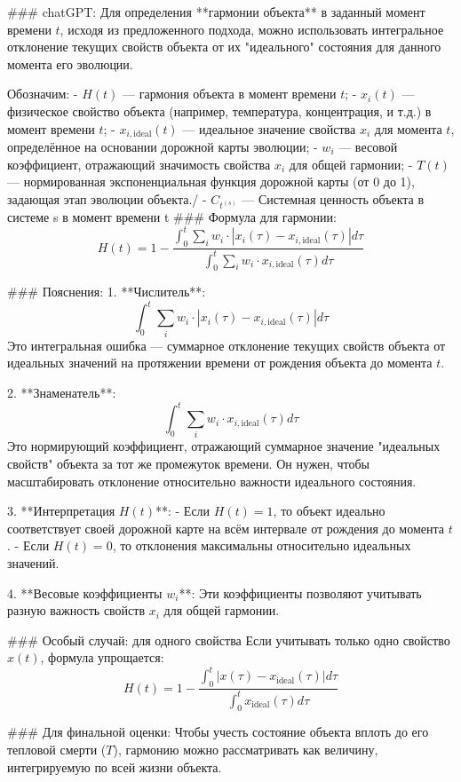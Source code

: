### chatGPT:
Для определения **гармонии объекта** в заданный момент времени \( t \), исходя из предложенного подхода, можно использовать интегральное отклонение текущих свойств объекта от их "идеального" состояния для данного момента его эволюции.

Обозначим:  
-  \( H(t) \) — гармония объекта в момент времени \( t \);  
-  \( x_i(t) \) — физическое свойство объекта (например, температура, концентрация, и т.д.) в момент времени \( t \);  
-  \( x_{i,\text{ideal}}(t) \) — идеальное значение свойства \( x_i \) для момента \( t \), определённое на основании дорожной карты эволюции;  
-  \( w_i \) — весовой коэффициент, отражающий значимость свойства \( x_i \) для общей гармонии;  
-  \( T(t) \) — нормированная экспоненциальная функция дорожной карты (от 0 до 1), задающая этап эволюции объекта./  
-  \( C_{t^{(s)}}\) — Системная ценность объекта в системе s  в момент времени t 
### Формула для гармонии:
\[
H(t) = 1 -\frac{\int_0^t \sum_{i} w_i \cdot \left| x_i(\tau) {-} x_{i,\text{ideal}}(\tau) \right| d\tau}{\int_0^t \sum_{i} w_i \cdot x_{i,\text{ideal}}(\tau) d\tau}
\]

### Пояснения:
1. **Числитель**:
   \[
   \int_0^t \sum_{i} w_i \cdot \left| x_i(\tau) {-} x_{i,\text{ideal}}(\tau) \right| d\tau
   \]
   Это интегральная ошибка — суммарное отклонение текущих свойств объекта от идеальных значений на протяжении времени от рождения объекта до момента \( t \).

2. **Знаменатель**:
   \[
   \int_0^t \sum_{i} w_i \cdot x_{i,\text{ideal}}(\tau) d\tau
   \]
   Это нормирующий коэффициент, отражающий суммарное значение "идеальных свойств" объекта за тот же промежуток времени. Он нужен, чтобы масштабировать отклонение относительно важности идеального состояния.

3. **Интерпретация \( H(t) \)**:
   - Если \( H(t) = 1 \), то объект идеально соответствует своей дорожной карте на всём интервале от рождения до момента \( t \).  
   - Если \( H(t) = 0 \), то отклонения максимальны относительно идеальных значений.

4. **Весовые коэффициенты \( w_i \)**:
   Эти коэффициенты позволяют учитывать разную важность свойств \( x_i \) для общей гармонии.

### Особый случай: для одного свойства
Если учитывать только одно свойство \( x(t) \), формула упрощается:  
\[
H(t) = 1 -\frac{\int_0^t \left| x(\tau) {-} x_{\text{ideal}}(\tau) \right| d\tau}{\int_0^t x_{\text{ideal}}(\tau) d\tau}
\]  

### Для финальной оценки:
Чтобы учесть состояние объекта вплоть до его тепловой смерти (\( T \)), гармонию можно рассматривать как величину, интегрируемую по всей жизни объекта.

